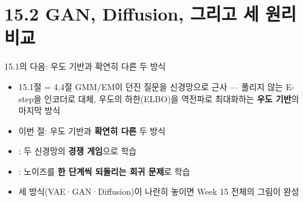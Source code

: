 \section{15.2 GAN, Diffusion, 그리고 세 원리 비교}
\begin{frame}{15.1의 다음: 우도 기반과 확연히 다른 두 방식}
  \begin{itemize}
    \item 15.1절  = 4.4절 GMM/EM이 던진 질문을 신경망으로
      근사 — 풀리지 않는 E-step을 인코더로 대체, 우도의 하한(ELBO)을
      역전파로 최대화하는 \textbf{우도 기반}의 마지막 방식
    \item 이번 절: 우도 기반과 \textbf{확연히 다른} 두 방식
    \item {}: 두 신경망의 \textbf{경쟁 게임}으로 학습
    \item {}: 노이즈를 \textbf{한 단계씩 되돌리는
      회귀 문제}로 학습
    \item 세 방식(VAE·GAN·Diffusion)이 나란히 놓이면 Week 15 전체의
      그림이 완성
  \end{itemize}
\end{frame}
